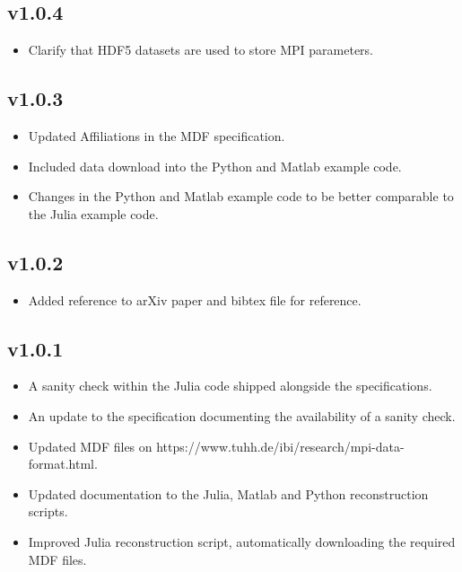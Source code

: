 \documentclass[landscape,a4paper]{article} %
\begin{document}
\begin{multicols}{2}
\subsection{v1.0.4}

\begin{itemize}
	\item Clarify that HDF5 datasets are used to store MPI parameters.
\end{itemize}


\subsection{v1.0.3}

\begin{itemize}
	\item Updated Affiliations in the MDF specification.
	\item Included data download into the Python and Matlab example code.
	\item Changes in the Python and Matlab example code to be better comparable to the Julia example code.
\end{itemize}


\subsection{v1.0.2}

\begin{itemize}
	\item Added reference to arXiv paper and bibtex file for reference.
\end{itemize}


\subsection{v1.0.1}

\begin{itemize}
	\item A sanity check within the Julia code shipped alongside the specifications.
	\item An update to the specification documenting the availability of a sanity check.
	\item Updated MDF files on https://www.tuhh.de/ibi/research/mpi-data-format.html.
	\item Updated documentation to the Julia, Matlab and Python reconstruction scripts.
	\item Improved Julia reconstruction script, automatically downloading the required MDF files.
\end{itemize}
\end{multicols}




\end{document}
